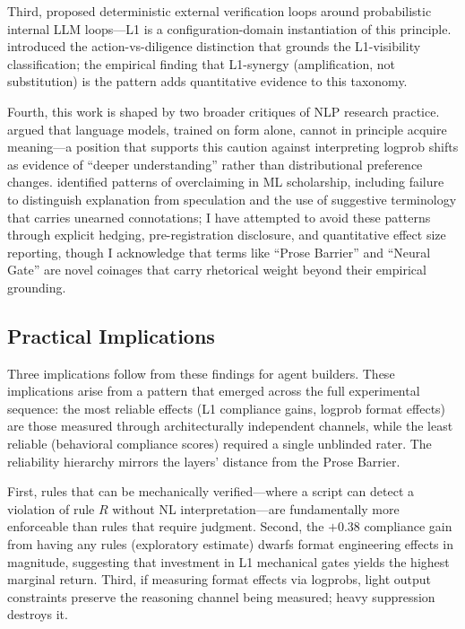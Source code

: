 \documentclass[11pt]{article}
\begin{document}
Third, \citet{loopengineering2026} proposed deterministic external verification
loops around probabilistic internal LLM loops---L1 is a configuration-domain
instantiation of this principle. \citet{czerwinski2026} introduced the
action-vs-diligence distinction that grounds the L1-visibility classification;
the empirical finding that L1-synergy (amplification, not substitution) is the pattern
adds quantitative evidence to this taxonomy.

Fourth, this work is shaped by two broader critiques of NLP research practice.
\citet{bender2020climbing} argued that language models, trained on form alone,
cannot in principle acquire meaning---a position that supports this caution
against interpreting logprob shifts as evidence of ``deeper understanding''
rather than distributional preference changes. \citet{lipton2018troubling}
identified patterns of overclaiming in ML scholarship, including failure to
distinguish explanation from speculation and the use of suggestive terminology
that carries unearned connotations; I have attempted to avoid these patterns
through explicit hedging, pre-registration disclosure, and quantitative effect
size reporting, though I acknowledge that terms like ``Prose Barrier'' and
``Neural Gate'' are novel coinages that carry rhetorical weight beyond their
empirical grounding.

\subsection{Practical Implications}

Three implications follow from these findings for agent builders. These
implications arise from a pattern that emerged across the full experimental
sequence: the most reliable effects (L1 compliance gains, logprob format effects)
are those measured through architecturally independent channels, while the least
reliable (behavioral compliance scores) required a single unblinded rater. The
reliability hierarchy mirrors the layers' distance from the Prose Barrier.

First,
rules that can be mechanically verified---where a script can detect a violation
of rule $R$ without NL interpretation---are fundamentally more enforceable than
rules that require judgment. Second, the $+0.38$ compliance gain from having
any rules (exploratory estimate) dwarfs format engineering effects in magnitude,
suggesting that investment in L1 mechanical gates yields the highest marginal
return. Third, if measuring format effects via logprobs, light output
constraints preserve the reasoning channel being measured; heavy suppression
destroys it.
\end{document}
